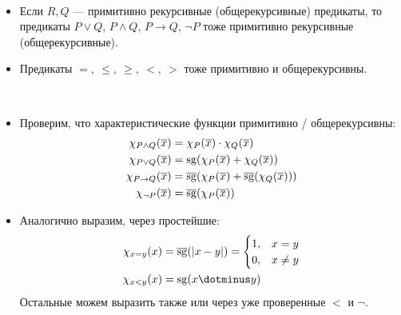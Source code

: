 \begin{st}
	~\begin{itemize}
		\item Если  $ R, Q$ --- примитивно рекурсивные (общерекурсивные) предикаты, то предикаты $ P \vee Q$, $P \wedge Q$, $P \to Q$, $\neg P$ тоже примитивно рекурсивные (общерекурсивные).
		\item Предикаты $ = , ~\le , ~\ge , ~<, ~>$ тоже примитивно и общерекурсивны.
    \end{itemize}
\end{st}
\begin{proof*}
	~\begin{itemize}
		\item Проверим, что характеристические функции примитивно / общерекурсивны: 
			\[
			\begin{aligned}
				\chi_{P \wedge  Q}(\overline{x}) & = \chi_{P}(\overline{x}) \cdot \chi_{Q}(\overline{x}) \\
				\chi_{P \vee Q}(\overline{x}) & = \operatorname{sg}(\chi_{P}(\overline{x}) + \chi_{Q}(\overline{x})) \\
				\chi_{P \to Q}(\overline{x}) &= \operatorname{\overline{sg}}(\chi_{P}(\overline{x}) + \operatorname{\overline{sg}}(\chi_{Q}(\overline{x}))) \\
				\chi_{\neg P} (\overline{x}) & = \operatorname{\overline{sg}}(\chi_{P}(\overline{x}))
			\end{aligned}
			\]
		\item Аналогично выразим, через простейшие:  
			\[
			\begin{aligned}
				\chi_{x=y} (x) &= \bsg(\lvert x - y \rvert ) = \begin{cases}
					1, &x=y \\
					0, &x\ne y
				\end{cases} \\
					\chi_{x< y}(x) &= \sg(x \dotminus y)
			\end{aligned}
			\]
			Остальные можем выразить также или через уже проверенные $ <$ и $ \neg$.
    \end{itemize}
\end{proof*}


